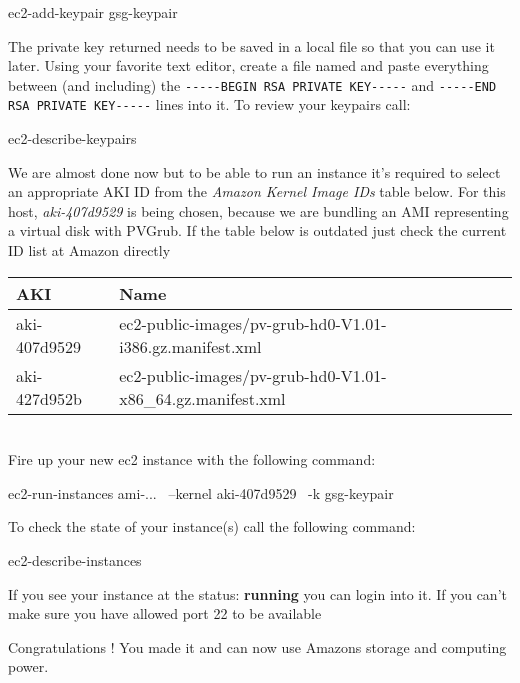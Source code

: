 \begin{Command}{10cm}
ec2-add-keypair gsg-keypair
\end{Command}

The private key returned needs to be saved in a local file so that
you can use it later. Using your favorite text editor, create a file
named  and paste everything between
(and including) the \texttt{-{}-{}-{}-{}-BEGIN RSA PRIVATE KEY-{}-{}-{}-{}-} and
\texttt{-{}-{}-{}-{}-END RSA PRIVATE KEY-{}-{}-{}-{}-} lines into it. To review
your keypairs call:

\begin{Command}{10cm}
ec2-describe-keypairs
\end{Command}

We are almost done now but to be able to run an instance it's
required to select an appropriate AKI ID from the
\textit{Amazon Kernel Image IDs} table below. For this host,
\textit{aki-407d9529} is being chosen, because we are bundling
an AMI representing a virtual disk with PVGrub. If the table
below is outdated just check the current ID list at Amazon
directly

\begin{tabular}[h]{|p{3cm}|p{6cm}|}
\hline
\textbf{AKI} & \textbf{Name} \\
\hline
aki-407d9529 & ec2-public-images/pv-grub-hd0-V1.01-i386.gz.manifest.xml \\
aki-427d952b & ec2-public-images/pv-grub-hd0-V1.01-x86\_64.gz.manifest.xml \\
\hline
\end{tabular}\\

Fire up your new ec2 instance with the following command:

\begin{Command}{13cm}
ec2-run-instances ami-... \
  --kernel aki-407d9529 \
  -k gsg-keypair
\end{Command}

To check the state of your instance(s) call the following command:

\begin{Command}{10cm}
ec2-describe-instances
\end{Command}

If you see your instance at the status: \textbf{running} you can login
into it. If you can't make sure you have allowed port 22 to be available

\begin{Command}{10cm}
ec2-authorize default -p 22
\end{verbatim}
\end{Command}

Congratulations ! You made it and can now use Amazons storage and
computing power.

